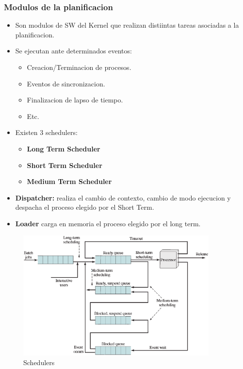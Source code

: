 \subsubsection{Modulos de la planificacion}
\begin{itemize}
    \item Son modulos de SW del Kernel que realizan distiintas tareas asociadas a la planificacion.
    \item Se ejecutan ante determinados eventos:
    \begin{itemize}
        \item Creacion/Terminacion de procesos.
        \item Eventos de sincronizacion.
        \item Finalizacion de lapso de tiempo.
        \item Etc.
    \end{itemize}
    \item Existen 3 schedulers:
        \begin{itemize}
            \item \textbf{Long Term Scheduler} 
            \item \textbf{Short Term Scheduler} 
            \item \textbf{Medium Term Scheduler} 
        \end{itemize}
    \item \textbf{Dispatcher:} realiza el cambio de contexto, cambio de modo ejecucion y despacha el proceso elegido por el Short Term.
    \item \textbf{Loader} carga en memoria el proceso elegido por el long term.
\end{itemize}
\begin{figure}[h]
    \begin{center}
        \includegraphics[width=0.90\textwidth]{assets/Schedulers.eps}
    \end{center}
    \caption{Schedulers}\label{fig:}
\end{figure}


